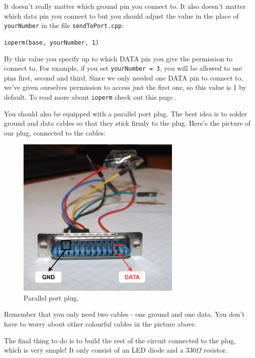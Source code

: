 \documentclass[12pt]{report}
\begin{document}
It doesn't really matter which ground pin you connect to. It also doesn't matter which data pin you connect to but you should adjust the value in the place of \verb|yourNumber| in the file \verb|sendToPort.cpp|:

\begin{snugshade}
\verb|ioperm(base, yourNumber, 1)|
\end{snugshade}

By this value you specify up to which DATA pin you give the permission to connect to. For example, if you set \verb|yourNumber = 3|, you will be allowed to use pins first, second and third. Since we only needed one DATA pin to connect to, we've given ourselves permission to access just the first one, so this value is 1 by default. To read more about \verb|ioperm| check out this page \cite{ioperm}.

You should also be equipped with a parallel port plug. The best idea is to solder ground and data cables so that they stick firmly to the plug. Here's the picture of our plug, connected to the cables:

\begin{figure}[H]
\centering\includegraphics[width=8cm]{parport_plug}
\caption{Parallel port plug.}				
\label{fig:parport_plug}
\end{figure}

Remember that you only need two cables - one ground and one data. You don't have to worry about other colourful cables in the picture above.

The final thing to do is to build the rest of the circuit connected to the plug, which is very simple! It only consist of an LED diode and a 330$\Omega$ resistor.
\end{document}
